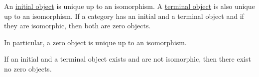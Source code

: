 \begin{proposition}\label{thm:zero_object_properties}
  \hfill
  \begin{thmenum}
     An \hyperref[def:zero_objects/initial]{initial object} is unique up to an isomorphism.
     A \hyperref[def:zero_objects/initial]{terminal object} is also unique up to an isomorphism.
     If a category has an initial and a terminal object and if they are isomorphic, then both are zero objects.

    In particular, a zero object is unique up to an isomorphism.

     If an initial and a terminal object exists and are not isomorphic, then there exist no zero objects.
  \end{thmenum}
\end{proposition}
